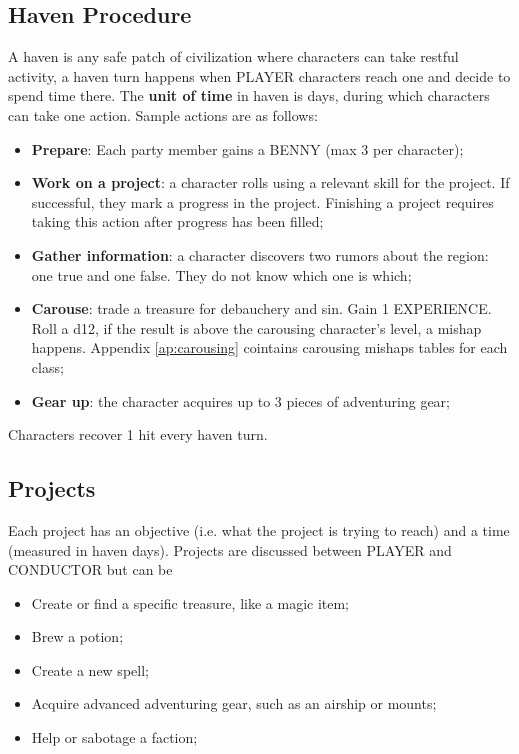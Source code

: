 \subsection{Haven Procedure}
A haven is any safe patch of civilization where characters can take restful activity, a haven turn happens when PLAYER characters reach one and decide to spend time there. The \textbf{unit of time} in haven is days, during which characters can take one action. Sample actions are as follows:
\begin{itemize}
    \item {\textbf{Prepare}: Each party member gains a BENNY (max 3 per character);}
    \item {\textbf{Work on a project}: a character rolls using a relevant skill for the project. If successful, they mark a progress in the project. Finishing a project requires taking this action after progress has been filled;}
    \item {\textbf{Gather information}: a character discovers two rumors about the region: one true and one false. They do not know which one is which;}
    \item {\textbf{Carouse}: trade a treasure for debauchery and sin. Gain 1 EXPERIENCE. Roll a d12, if the result is above the carousing character's level, a mishap happens. Appendix \ref{ap:carousing} cointains carousing mishaps tables for each class;}
    \item {\textbf{Gear up}: the character acquires up to 3 pieces of adventuring gear;}
\end{itemize}
Characters recover 1 hit every haven turn.

\subsection{Projects}
Each project has an objective (i.e. what the project is trying to reach) and a time (measured in haven days). Projects are discussed between PLAYER and CONDUCTOR but can be
\begin{itemize}
    \item Create or find a specific treasure, like a magic item;
    \item Brew a potion;
    \item Create a new spell;
    \item Acquire advanced adventuring gear, such as an airship or mounts;
    \item Help or sabotage a faction;
\end{itemize}

